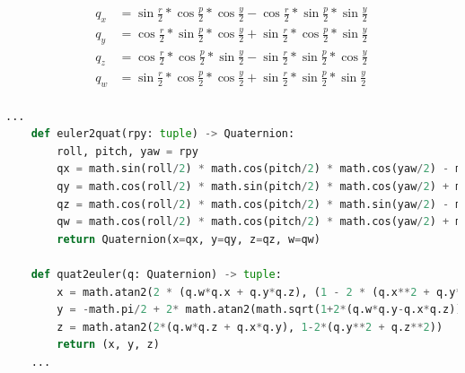 \begin{myequation}[h!]
  \begin{equation}
  \begin{aligned}
  q_x &= \sin{\frac{r}{2}} * \cos{\frac{p}{2}} * \cos{\frac{y}{2}} - \cos{\frac{r}{2}} * \sin{\frac{p}{2}} * \sin{\frac{y}{2}}  \\
  q_y &= \cos{\frac{r}{2}} * \sin{\frac{p}{2}} * \cos{\frac{y}{2}} + \sin{\frac{r}{2}} * \cos{\frac{p}{2}} * \sin{\frac{y}{2}}  \\
  q_z &= \cos{\frac{r}{2}} * \cos{\frac{p}{2}} * \sin{\frac{y}{2}} - \sin{\frac{r}{2}} * \sin{\frac{p}{2}} * \cos{\frac{y}{2}}  \\
  q_w &= \sin{\frac{r}{2}} * \cos{\frac{p}{2}} * \cos{\frac{y}{2}} + \sin{\frac{r}{2}} * \sin{\frac{p}{2}} * \sin{\frac{y}{2}}  \\
  \end{aligned}
  \label{ec:quat_to_euler}
  \end{equation}
  \caption[Obtención de cuaterniones a partir de ángulos de Euler (RPY)]{Obtención de cuaterniones a partir de ángulos de Euler (RPY)}
\end{myequation}

\begin{code}[h!]
  \begin{lstlisting}[language=Python]
    ...
    def euler2quat(rpy: tuple) -> Quaternion:
        roll, pitch, yaw = rpy
        qx = math.sin(roll/2) * math.cos(pitch/2) * math.cos(yaw/2) - math.cos(roll/2) * math.sin(pitch/2) * math.sin(yaw/2)
        qy = math.cos(roll/2) * math.sin(pitch/2) * math.cos(yaw/2) + math.sin(roll/2) * math.cos(pitch/2) * math.sin(yaw/2)
        qz = math.cos(roll/2) * math.cos(pitch/2) * math.sin(yaw/2) - math.sin(roll/2) * math.sin(pitch/2) * math.cos(yaw/2)
        qw = math.cos(roll/2) * math.cos(pitch/2) * math.cos(yaw/2) + math.sin(roll/2) * math.sin(pitch/2) * math.sin(yaw/2)
        return Quaternion(x=qx, y=qy, z=qz, w=qw)

    def quat2euler(q: Quaternion) -> tuple:
        x = math.atan2(2 * (q.w*q.x + q.y*q.z), (1 - 2 * (q.x**2 + q.y**2)))
        y = -math.pi/2 + 2* math.atan2(math.sqrt(1+2*(q.w*q.y-q.x*q.z)), math.sqrt(1-2*(q.w*q.y-q.x*q.z)))
        z = math.atan2(2*(q.w*q.z + q.x*q.y), 1-2*(q.y**2 + q.z**2))
        return (x, y, z)
    ...
  \end{lstlisting}
\caption[Funciones matemáticas del módulo \texttt{geom\_utils.py}]{Funciones matemáticas del módulo \texttt{geom\_utils.py}}
\label{cod:geom_utils}
\end{code}

